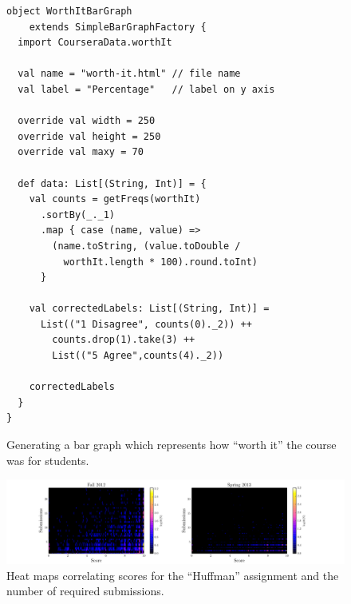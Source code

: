 \documentclass{sig-alternate}
\begin{document}
\begin{figure}[ht!]
  \begin{lstlisting}
object WorthItBarGraph
    extends SimpleBarGraphFactory {
  import CourseraData.worthIt

  val name = "worth-it.html" // file name
  val label = "Percentage"   // label on y axis

  override val width = 250
  override val height = 250
  override val maxy = 70

  def data: List[(String, Int)] = {
    val counts = getFreqs(worthIt)
      .sortBy(_._1)
      .map { case (name, value) =>
        (name.toString, (value.toDouble /
          worthIt.length * 100).round.toInt)
      }

    val correctedLabels: List[(String, Int)] =
      List(("1 Disagree", counts(0)._2)) ++
        counts.drop(1).take(3) ++
        List(("5 Agree",counts(4)._2))

    correctedLabels
  }
}
  \end{lstlisting}
  \caption{Generating a bar graph which
    represents how ``worth it'' the course was for students.}

  \label{fig:bar-chart}
\end{figure}

\begin{figure}[ht!]
  \centering
  \includegraphics[width=\textwidth]{plots/score-2d-histogram-fall2012-spring2013.pdf}
  \vspace{-0.8cm}
  \caption{Heat maps correlating scores for the ``Huffman'' assignment and the number
  of required submissions.}
  \label{fig:2d-histogram}
\end{figure}
\end{document}
